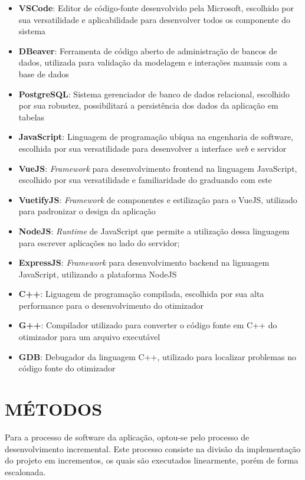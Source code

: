 \begin{itemize}
	\item \textbf{VSCode}: Editor de código-fonte desenvolvido pela Microsoft, escolhido por sua versatilidade e aplicabilidade para desenvolver todos os componente do sistema
	\item \textbf{DBeaver}: Ferramenta de código aberto de administração de bancos de dados, utilizada para validação da modelagem e interações manuais com a base de dados
	\item \textbf{PostgreSQL}: Sistema gerenciador de banco de dados relacional, escolhido por sua robustez, possibilitará a persistência dos dados da aplicação em tabelas
	\item \textbf{JavaScript}: Linguagem de programação ubíqua na engenharia de software, escolhida por sua versatilidade para desenvolver a interface \textit{web} e servidor
	\item \textbf{VueJS}: \textit{Framework} para desenvolvimento frontend na linguagem JavaScript, escolhido por sua versatilidade e familiaridade do graduando com este
	\item \textbf{VuetifyJS}: \textit{Framework} de componentes e estilização para o VueJS, utilizado para padronizar o design da aplicação
	\item \textbf{NodeJS}: \textit{Runtime} de JavaScript que permite a utilização dessa linguagem para escrever aplicações no lado do servidor;
	\item \textbf{ExpressJS}: \textit{Framework} para desenvolvimento backend na lignuagem JavaScript, utilizando a plataforma NodeJS
	\item \textbf{C++}: Liguagem de programação compilada, escolhida por sua alta performance para o desenvolvimento do otimizador
	\item \textbf{G++}: Compilador utilizado para converter o código fonte em C++ do otimizador para um arquivo executável 
	\item \textbf{GDB}: Debugador da linguagem C++, utilizado para localizar problemas no código fonte do otimizador
\end{itemize}

\section{MÉTODOS}
\label{sec:metodos}

Para a processo de software da aplicação, optou-se pelo processo de desenvolvimento incremental. Este processo consiste na divisão da implementação do projeto em incrementos, os quais são executados linearmente, porém de forma escalonada.\cite{pressman2016}

